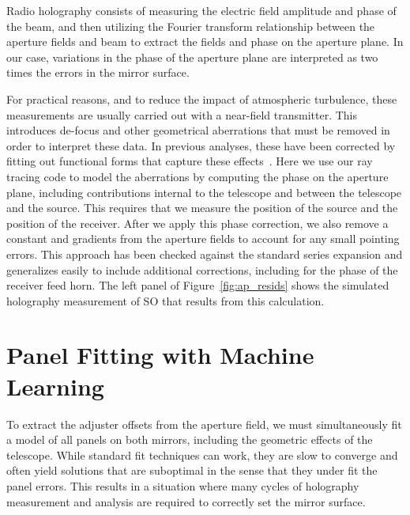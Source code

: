 \label{sec:method_align}
Radio holography consists of measuring the electric field amplitude and phase of the beam, and then utilizing the Fourier transform relationship between the aperture fields and beam to extract the fields and phase on the aperture plane.  In our case, variations in the phase of the aperture plane are interpreted as two times the errors in the mirror surface.

For practical reasons, and to reduce the impact of atmospheric turbulence, these measurements are usually carried out with a near-field transmitter.  This introduces de-focus and other geometrical aberrations that must be removed in order to interpret these data.  In previous analyses, these have been corrected by fitting out functional forms that capture these effects~\cite{alma_holog}.  Here we use our ray tracing code to model the aberrations by computing the phase on the aperture plane, including contributions internal to the telescope and between the telescope and the source.  This requires that we measure the position of the source and the position of the receiver.  After we apply this phase correction, we also remove a constant and gradients from the aperture fields to account for any small pointing errors.  This approach has been checked against the standard series expansion and generalizes easily to include additional corrections, including for the phase of the receiver feed horn.  The left panel of Figure~\ref{fig:ap_resids} shows the simulated holography measurement of SO that results from this calculation.

\section{Panel Fitting with Machine Learning}
\label{sec:ml}
To extract the adjuster offsets from the aperture field, we must simultaneously fit a model of all panels on both mirrors, including the geometric effects of the telescope.  While standard fit techniques can work, they are slow to converge and often yield solutions that are suboptimal in the sense that they under fit the panel errors.  This results in a situation where many cycles of holography measurement and analysis are required to correctly set the mirror surface.


